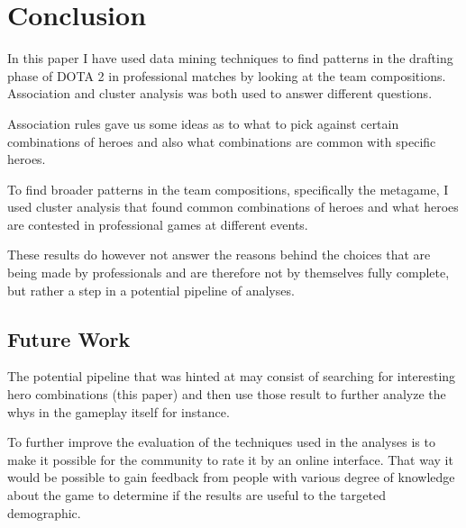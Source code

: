 \documentclass[result.tex]{subfiles}
\begin{document}
\section*{\centering Conclusion}

In this paper I have used data mining techniques to find patterns in the drafting phase of DOTA 2 in professional matches by looking at the team compositions. Association and cluster analysis was both used to answer different questions.

Association rules gave us some ideas as to what to pick against certain combinations of heroes and also what combinations are common with specific heroes.

To find broader patterns in the team compositions, specifically the metagame, I used cluster analysis that found common combinations of heroes and what heroes are contested in professional games at different events.

These results do however not answer the reasons behind the choices that are being made by professionals and are therefore not by themselves fully complete, but rather a step in a potential pipeline of analyses.

\subsection*{Future Work}

The potential pipeline that was hinted at may consist of searching for interesting hero combinations (this paper) and then use those result to further analyze the whys in the gameplay itself for instance.

To further improve the evaluation of the techniques used in the analyses is to make it possible for the community to rate it by an online interface. That way it would be possible to gain feedback from people with various degree of knowledge about the game to determine if the results are useful to the targeted demographic.
\end{document}
